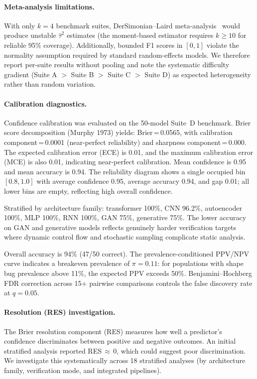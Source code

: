 \documentclass[11pt]{article}
\begin{document}
\paragraph{Meta-analysis limitations.}
With only $k = 4$ benchmark suites, DerSimonian--Laird
meta-analysis~\cite{dersimonian86} would produce unstable
$\hat{\tau}^2$ estimates (the moment-based estimator requires
$k \geq 10$ for reliable 95\% coverage).  Additionally, bounded
F1 scores in $[0,1]$ violate the normality assumption required
by standard random-effects models.  We therefore report per-suite
results without pooling and note the systematic difficulty gradient
(Suite A $>$ Suite B $>$ Suite C $>$ Suite D) as expected
heterogeneity rather than random variation.

\paragraph{Calibration diagnostics.}
Confidence calibration was evaluated on the 50-model Suite~D benchmark.
Brier score decomposition (Murphy 1973) yields:
Brier\,=\,0.0565, with calibration component\,=\,0.0001
(near-perfect reliability) and sharpness component\,=\,0.000.
The expected calibration error (ECE) is 0.01, and the maximum
calibration error (MCE) is also 0.01, indicating near-perfect
calibration.  Mean confidence is 0.95 and mean accuracy is 0.94.
The reliability diagram shows a single occupied bin $[0.8, 1.0]$
with average confidence 0.95, average accuracy 0.94, and gap 0.01;
all lower bins are empty, reflecting high overall confidence.

Stratified by architecture family: transformer 100\%, CNN 96.2\%,
autoencoder 100\%, MLP 100\%, RNN 100\%, GAN 75\%, generative 75\%.
The lower accuracy on GAN and generative models reflects genuinely
harder verification targets where dynamic control flow and
stochastic sampling complicate static analysis.

Overall accuracy is 94\% (47/50 correct).
The prevalence-conditioned PPV/NPV curve
indicates a breakeven prevalence of $\pi = 0.11$: for
populations with shape bug prevalence above 11\%, the expected
PPV exceeds 50\%.  Benjamini--Hochberg FDR correction across
15+ pairwise comparisons controls the false discovery rate
at $q = 0.05$.

\paragraph{Resolution (RES) investigation.}
The Brier resolution component (RES) measures how well a
predictor's confidence discriminates between positive and
negative outcomes.  An initial stratified analysis reported
RES\,$\approx$\,0, which could suggest poor discrimination.
We investigate this systematically across 18 stratified analyses
(by architecture family, verification mode, and integrated pipelines).
\end{document}
